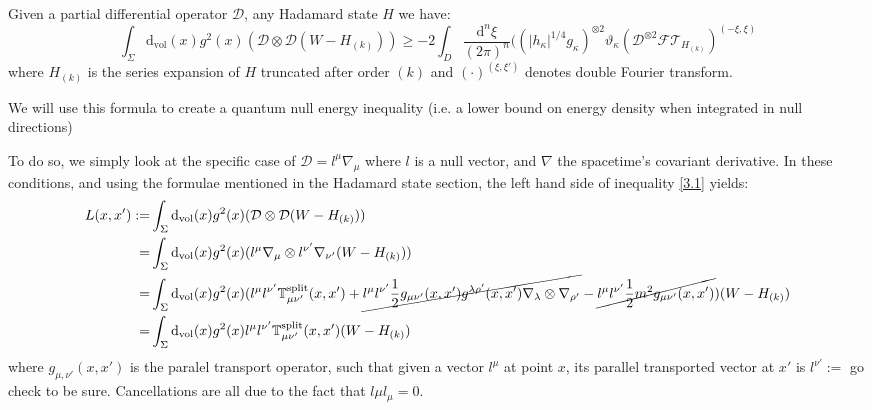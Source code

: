 \documentclass[a4paper,11pt]{article}
\numberwithin{equation}{section}
\theoremstyle{definition}
\renewcommand{\d}{{\mathrm{d}}}
\begin{document}
Given a partial differential operator $\mathcal{D}$, any Hadamard state $H$ we have:
\begin{equation}\label{3.1}
    \int_\Sigma \d_\mathrm{vol}(x) g^2(x) (\mathcal{D}\otimes\mathcal{D}(W-H_{(k)}))\geq -2\int_D\frac{\d^n\xi}{(2\pi)^n}((|h_\kappa|^{1/4}g_\kappa)^{\otimes 2}\vartheta_\kappa(\mathcal{D}^{\otimes2}\mathcal{FT}_{H_{(k)}})^{(-\xi,\xi)}
\end{equation}
where $H_{(k)}$ is the series expansion of $H$ truncated after order $(k)$ and $(\cdot)^{(\xi,\xi')}$ denotes double Fourier transform.

We will use this formula to create a quantum null energy inequality (i.e. a lower bound on energy density when integrated in null directions)

To do so, we simply look at the specific case of $\mathcal{D}=l^\mu\nabla_\mu$ where $l$ is a null vector, and $\nabla$ the spacetime's covariant derivative. In these conditions, and using the formulae mentioned in the Hadamard state section, the left hand side of inequality \ref{3.1} yields:
\begin{align*}
    L(x,x'):=& \int_\Sigma \d_\mathrm{vol}(x) g^2(x) (\mathcal{D}\otimes\mathcal{D}(W-H_{(k)}))\\
    =& \int_\Sigma \d_\mathrm{vol}(x) g^2(x) (l^\mu\nabla_\mu\otimes l^{\nu'}\nabla_{\nu'}(W-H_{(k)}))\\
    =& \int_\Sigma \d_\mathrm{vol}(x) g^2(x) (l^\mu l^{\nu'}\mathbb{T}^\mathrm{split}_{\mu\nu'}(x,x')+\cancel{l^\mu l^{\nu'}\frac{1}{2}g_{\mu\nu'}(x,x')g^{\lambda\rho'}(x,x')\nabla_\lambda\otimes\nabla_{\rho'}}-\cancel{l^\mu l^{\nu'}\frac{1}{2}m^2g_{\mu\nu'}(x,x')})(W-H_{(k)})\\
    =& \int_\Sigma \d_\mathrm{vol}(x) g^2(x) l^\mu l^{\nu'}\mathbb{T}^\mathrm{split}_{\mu\nu'}(x,x')(W-H_{(k)})
\end{align*}
where $g_{\mu,\nu'}(x,x')$ is the paralel transport operator, such that given a vector $l^\mu$ at point $x$, its parallel transported vector at $x'$ is $l^{\nu'}:=$ \color{red} go check to be sure\color{black}. Cancellations are all due to the fact that $l\mu l_\mu=0$.
\end{document}
